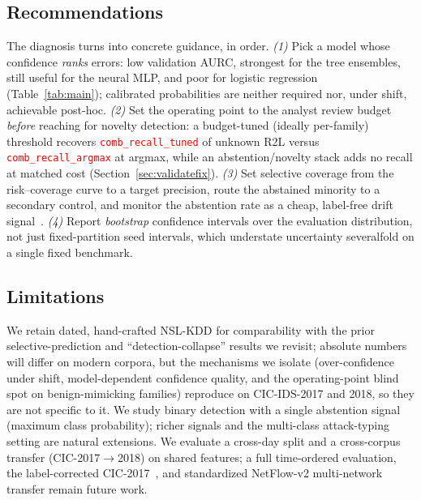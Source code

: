 \documentclass[conference,a4paper]{IEEEtran}
\newcommand{\PH}[1]{\textcolor{red}{\texttt{#1}}}
\begin{document}
\subsection{Recommendations}
The diagnosis turns into concrete guidance, in order. \emph{(1)} Pick a model whose confidence
\emph{ranks} errors: low validation AURC, strongest for the tree ensembles, still useful for the neural
MLP, and poor for logistic regression (Table~\ref{tab:main}); calibrated probabilities are neither
required nor, under shift, achievable post-hoc. \emph{(2)} Set the operating point to the analyst review budget \emph{before}
reaching for novelty detection: a budget-tuned (ideally per-family) threshold recovers
\PH{comb_recall_tuned} of unknown R2L versus \PH{comb_recall_argmax} at argmax, while an abstention/novelty
stack adds no recall at matched cost (Section~\ref{sec:validatefix}). \emph{(3)} Set selective coverage
from the risk--coverage curve to a target precision, route the abstained minority to a secondary control,
and monitor the abstention rate as a cheap, label-free drift
signal~\cite{jordaney2017transcend,yang2021cade}. \emph{(4)} Report \emph{bootstrap} confidence intervals
over the evaluation distribution, not just fixed-partition seed intervals, which understate uncertainty
severalfold on a single fixed benchmark.

\subsection{Limitations}
We retain dated, hand-crafted NSL-KDD for comparability with the prior selective-prediction and
``detection-collapse'' results we revisit; absolute numbers will differ on modern corpora, but
the mechanisms we isolate (over-confidence under shift, model-dependent confidence quality, and the
operating-point blind spot on benign-mimicking families) reproduce on CIC-IDS-2017 and 2018, so they are
not specific to it. We study binary detection with a
single abstention signal (maximum class probability); richer signals and the multi-class
attack-typing setting are natural extensions. We evaluate a cross-day split and a cross-corpus transfer
(CIC-2017$\to$2018) on shared features; a full time-ordered evaluation, the label-corrected
CIC-2017~\cite{engelen2021troubleshooting}, and standardized NetFlow-v2 multi-network transfer remain
future work.
\end{document}
